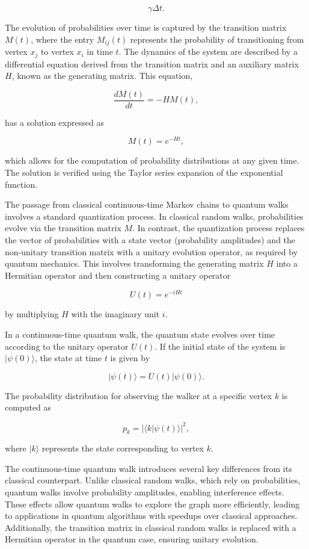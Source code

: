 \documentclass[11pt]{article}
\theoremstyle{definition}
\begin{document}
\[
\gamma \Delta t.
\]

The evolution of probabilities over time is captured by the transition matrix \( M(t) \), where the entry \( M_{ij}(t) \) represents the probability of transitioning from vertex \( x_j \) to vertex \( x_i \) in time \( t \). The dynamics of the system are described by a differential equation derived from the transition matrix and an auxiliary matrix \( H \), known as the generating matrix. This equation, 

\[
\frac{dM(t)}{dt} = -H M(t),
\]

has a solution expressed as 

\[
M(t) = e^{-Ht},
\]

which allows for the computation of probability distributions at any given time. The solution is verified using the Taylor series expansion of the exponential function.

The passage from classical continuous-time Markov chains to quantum walks involves a standard quantization process. In classical random walks, probabilities evolve via the transition matrix \( M \). In contrast, the quantization process replaces the vector of probabilities with a state vector (probability amplitudes) and the non-unitary transition matrix with a unitary evolution operator, as required by quantum mechanics. This involves transforming the generating matrix \( H \) into a Hermitian operator and then constructing a unitary operator 

\[
U(t) = e^{-iHt}
\]

by multiplying \( H \) with the imaginary unit \( i \).

In a continuous-time quantum walk, the quantum state evolves over time according to the unitary operator \( U(t) \). If the initial state of the system is \( |\psi(0)\rangle \), the state at time \( t \) is given by 

\[
|\psi(t)\rangle = U(t) |\psi(0)\rangle.
\]

The probability distribution for observing the walker at a specific vertex \( k \) is computed as 

\[
p_k = |\langle k | \psi(t) \rangle|^2,
\]

where \( |k\rangle \) represents the state corresponding to vertex \( k \).

The continuous-time quantum walk introduces several key differences from its classical counterpart. Unlike classical random walks, which rely on probabilities, quantum walks involve probability amplitudes, enabling interference effects. These effects allow quantum walks to explore the graph more efficiently, leading to applications in quantum algorithms with speedups over classical approaches. Additionally, the transition matrix in classical random walks is replaced with a Hermitian operator in the quantum case, ensuring unitary evolution.
\end{document}
